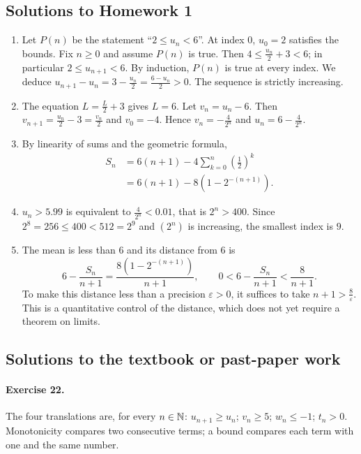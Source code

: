 \subsection{Solutions to Homework 1}\begin{enumerate}
\item Let $P(n)$ be the statement ``$2\le u_n<6$''. At index $0$, $u_0=2$ satisfies the bounds. Fix $n\ge0$ and assume $P(n)$ is true. Then $4\le \frac{u_n}{2}+3<6$; in particular $2\le u_{n+1}<6$. By induction, $P(n)$ is true at every index. We deduce $u_{n+1}-u_n=3-\frac{u_n}{2}=\frac{6-u_n}{2}>0$. The sequence is strictly increasing.
\item The equation $L=\frac{L}{2}+3$ gives $L=6$. Let $v_n=u_n-6$. Then $v_{n+1}=\frac{u_n}{2}-3=\frac{v_n}{2}$ and $v_0=-4$. Hence $v_n=-\frac{4}{2^n}$ and $u_n=6-\frac{4}{2^n}$.
\item By linearity of sums and the geometric formula,
\[\begin{aligned}S_n&=6(n+1)-4\sum_{k=0}^n(\frac{1}{2})^k\\&=6(n+1)-8(1-2^{-(n+1)}).\end{aligned}\]
\item $u_n>5.99$ is equivalent to $\frac{4}{2^n}<0.01$, that is $2^n>400$. Since $2^8=256\le400<512=2^9$ and $(2^n)$ is increasing, the smallest index is $9$.
\item The mean is less than $6$ and its distance from $6$ is
\[6-\frac{S_n}{n+1}=\frac{8(1-2^{-(n+1)})}{n+1},\qquad 0<6-\frac{S_n}{n+1}<\frac8{n+1}.\]
To make this distance less than a precision $\varepsilon>0$, it suffices to take $n+1>\frac{8}{\varepsilon}$. This is a quantitative control of the distance, which does not yet require a theorem on limits.
\end{enumerate}

\subsection{Solutions to the textbook or past-paper work}\paragraph{Exercise 22.} The four translations are, for every $n\in\mathbb N$: $u_{n+1}\ge u_n$; $v_n\ge5$; $w_n\le-1$; $t_n>0$. Monotonicity compares two consecutive terms; a bound compares each term with one and the same number.
